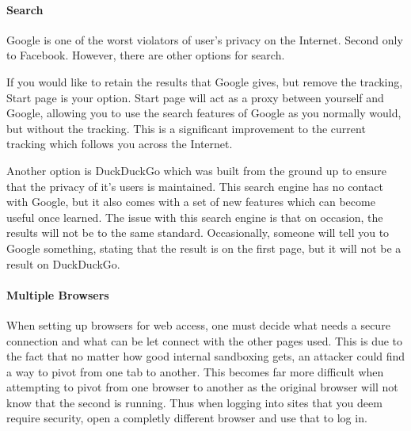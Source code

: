 \documentclass[a4paper,11pt,draft]{article}
\begin{document}
		\paragraph{Search}
			Google is one of the worst violators of user's privacy on the Internet. Second only to Facebook. 
			However, there are other options for search. \par 
			If you would like to retain the results that Google gives, but remove the tracking, Start page is your option. 
			Start page will act as a proxy between yourself and Google, allowing you to use the search features of Google as you normally would, but without the tracking. 
			This is a significant improvement to the current tracking which follows you across the Internet. \par 
			Another option is DuckDuckGo which was built from the ground up to ensure that the privacy of it's users is maintained. 
			This search engine has no contact with Google, but it also comes with a set of new features which can become useful once learned. 
			The issue with this search engine is that on occasion, the results will not be to the same standard. 
			Occasionally, someone will tell you to Google something, stating that the result is on the first page, but it will not be a result on DuckDuckGo. 
		\paragraph{Multiple Browsers}
			When setting up browsers for web access, one must decide what needs a secure connection and what can be let connect with the other pages used. 
			This is due to the fact that no matter how good internal sandboxing gets, an attacker could find a way to pivot from one tab to another. 
			This becomes far more difficult when attempting to pivot from one browser to another as the original browser will not know that the second is running. 
			Thus when logging into sites that you deem require security, open a completly different browser and use that to log in. 
\end{document}
